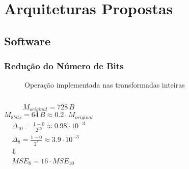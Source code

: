 \documentclass{beamer}
\begin{document}
\section{Arquiteturas Propostas}

\subsection{Software}


\begin{frame}
       \frametitle{Redução do Número de Bits}
       \begin{figure}[h]
              \centering
              
              \caption{Operação implementada nas transformadas inteiras}
       \end{figure}
       \begin{columns}
                     \begin{equation*}
                            M_{original} = 728\, B
                     \end{equation*}
                     \begin{equation*}
                            M_{8 bits} = 64\, B \approx 0.2\cdot M_{original}
                     \end{equation*}
                     \begin{gather*}
                            \Delta_{10} = \frac{1-0}{2^{10}} \approx 0.98\cdot10^{-3}\\
                            \Delta_{8} = \frac{1-0}{2^{8}} \approx 3.9\cdot10^{-3}\\
                            \Downarrow \\
                            MSE_{8} = 16\cdot MSE_{10} 
                     \end{gather*}
       \end{columns}
\end{frame}
\end{document}
